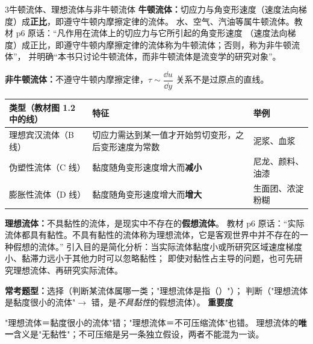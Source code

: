 \begin{kaodian}{3}{牛顿流体、理想流体与非牛顿流体}
\textbf{牛顿流体：}切应力与角变形速度（速度法向梯度）成\textbf{正比}，即遵守牛顿内摩擦定律的流体。
水、空气、汽油等属牛顿流体。教材 p6 原话：“凡作用在流体上的切应力与它所引起的角变形速度
（速度法向梯度）成正比，即遵守牛顿内摩擦定律的流体称为牛顿流体；否则，称为非牛顿流体”，
并明确“本书只讨论牛顿流体，而非牛顿流体是流变学的研究对象”。

\textbf{非牛顿流体：}不遵守牛顿内摩擦定律，$\tau\sim\dfrac{\dd u}{\dd y}$ 关系不是过原点的直线。
\begin{center}
\begin{tabularx}{\textwidth}{@{}lXl@{}}
\toprule
类型（教材图 1.2 中的线） & 特征 & 举例 \\
\midrule
理想宾汉流体（B 线） & 切应力需达到某一值才开始剪切变形，之后变形速度为常数 & 泥浆、血浆 \\
伪塑性流体（C 线） & 黏度随角变形速度增大而\textbf{减小} & 尼龙、颜料、油漆 \\
膨胀性流体（D 线） & 黏度随角变形速度增大而\textbf{增大} & 生面团、浓淀粉糊 \\
\bottomrule
\end{tabularx}
\end{center}

\textbf{理想流体：}不具黏性的流体，是现实中不存在的\textbf{假想流体}。
教材 p6 原话：“实际流体都具有黏性。不具有黏性的流体称为理想流体，它是客观世界中并不存在的一种假想的流体。”
引入目的是简化分析：当实际流体黏度小或所研究区域速度梯度小、黏滞力远小于其他力时可以忽略黏性；
即使对黏性占主导的问题，也可先研究理想流体、再研究实际流体。

\textbf{常考题型：}选择（判断某流体属哪一类；"理想流体是指（\quad）"）；
判断（"理想流体是黏度很小的流体"$\to$ 错，是\emph{不具黏性}的假想流体）。
\textbf{重要度 }\quad{}\quad{}

\begin{yicuo}
"理想流体＝黏度很小的流体"错；"理想流体＝不可压缩流体"也错。
理想流体的\textbf{唯一}含义是"无黏性"；不可压缩是另一条独立假设，两者不能混为一谈。
\end{yicuo}
\end{kaodian}

